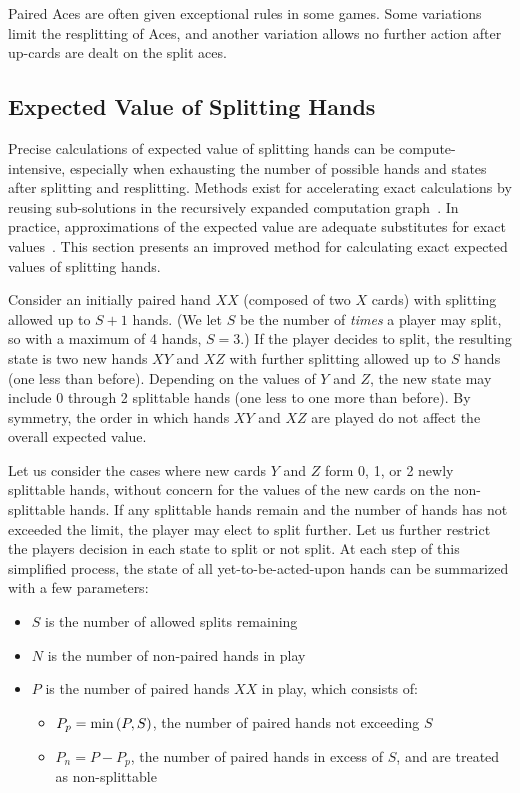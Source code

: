 Paired Aces are often given exceptional rules in some games.
Some variations limit the resplitting of Aces, 
and another variation allows no further action after
up-cards are dealt on the split aces.  

\subsection{Expected Value of Splitting Hands}
\label{sec:basic:split:calc}

Precise calculations of expected value of splitting hands can be 
compute-intensive, especially when exhausting the number of 
possible hands and states after splitting and resplitting.
Methods exist for accelerating exact calculations by 
reusing sub-solutions in the recursively expanded 
computation graph~\cite{ref:nairn08}.
In practice, approximations of the expected value are adequate 
substitutes for exact values~\cite{ref:griffin99}.  
This section presents an improved method for calculating exact 
expected values of splitting hands.

Consider an initially paired hand $XX$ (composed of two $X$ cards)
with splitting allowed up to $S+1$ hands.
(We let $S$ be the number of \emph{times} a player may split, 
so with a maximum of 4 hands, $S=3$.)
If the player decides to split, the resulting state is
two new hands $XY$ and $XZ$ with further splitting allowed up to $S$ hands 
(one less than before).  
Depending on the values of $Y$ and $Z$, the new state may include 
0 through 2 splittable hands (one less to one more than before).  
By symmetry, the order in which hands $XY$ and $XZ$ are played 
do not affect the overall expected value.  

Let us consider the cases where new cards
$Y$ and $Z$ form 0, 1, or 2 newly splittable hands, 
without concern for the values of the new cards on the non-splittable hands.
If any splittable hands remain and the number of hands has not exceeded
the limit, the player may elect to split further.
Let us further restrict the players decision in each state to 
split or not split.
At each step of this simplified process, 
the state of all yet-to-be-acted-upon hands can be 
summarized with a few parameters:

\begin{itemize}
\item $S$ is the number of allowed splits remaining
\item $N$ is the number of non-paired hands in play
\item $P$ is the number of paired hands $XX$ in play, which consists of:
\begin{itemize}
\item $P_p=\textrm{min}\left(P,S\right)$, the number of paired hands not exceeding $S$
\item $P_n=P-P_p$, the number of paired hands in excess of $S$, 
	and are treated as non-splittable
\end{itemize}
\end{itemize}

